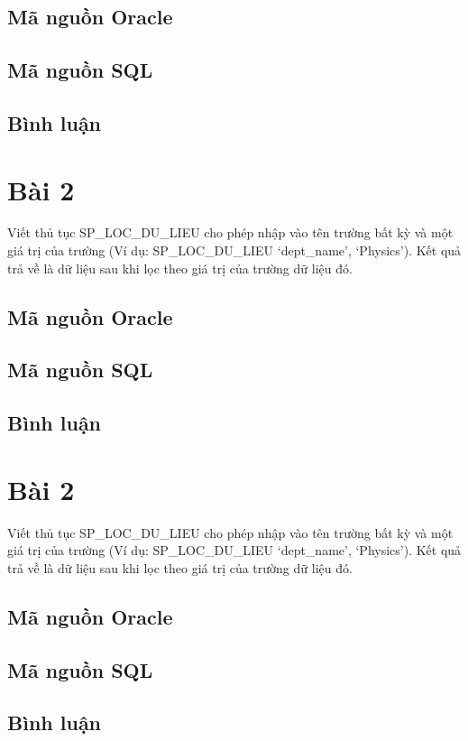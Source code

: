 \documentclass[12pt,a4paper]{report}
\begin{document}
\subsection{Mã nguồn Oracle}

\subsection{Mã nguồn SQL}

\subsection{Bình luận}

\section{Bài 2}
\begin{boxedminipage}[t]{15.5cm}
	Viết thủ tục SP\_LOC\_DU\_LIEU cho phép nhập vào tên trường bất kỳ và một giá trị của trường (Ví dụ: SP\_LOC\_DU\_LIEU ‘dept\_name’, ‘Physics’). Kết quả trả về là dữ liệu sau khi lọc theo giá trị của trường dữ liệu đó. 	
\end{boxedminipage}

\subsection{Mã nguồn Oracle}

\subsection{Mã nguồn SQL}

\subsection{Bình luận}

\section{Bài 2}
\begin{boxedminipage}[t]{15.5cm}
	Viết thủ tục SP\_LOC\_DU\_LIEU cho phép nhập vào tên trường bất kỳ và một giá trị của trường (Ví dụ: SP\_LOC\_DU\_LIEU ‘dept\_name’, ‘Physics’). Kết quả trả về là dữ liệu sau khi lọc theo giá trị của trường dữ liệu đó. 	
\end{boxedminipage}

\subsection{Mã nguồn Oracle}

\subsection{Mã nguồn SQL}

\subsection{Bình luận}
\end{document}
